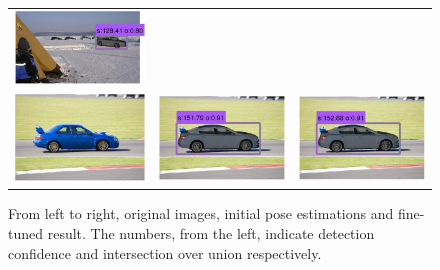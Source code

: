 \documentclass[10pt,twocolumn,letterpaper]{article}
\begin{document}
\begin{figure}[h]
\begin{tabular}{ccc}
  \includegraphics[width=0.22\linewidth]{supp/tuning_5c.png}  \\
  \includegraphics[width=0.22\linewidth]{supp/tuning_6a.png} &
  \includegraphics[width=0.22\linewidth]{supp/tuning_6b.png} & 
  \includegraphics[width=0.22\linewidth]{supp/tuning_6c.png}  \\
  \end{tabular}
\caption{From left to right, original images, initial pose estimations and
fine-tuned result. The numbers, from the left, indicate detection confidence
and intersection over union respectively.} 
  \label{fig:tuning}
\end{figure}


{\small


}
\end{document}
